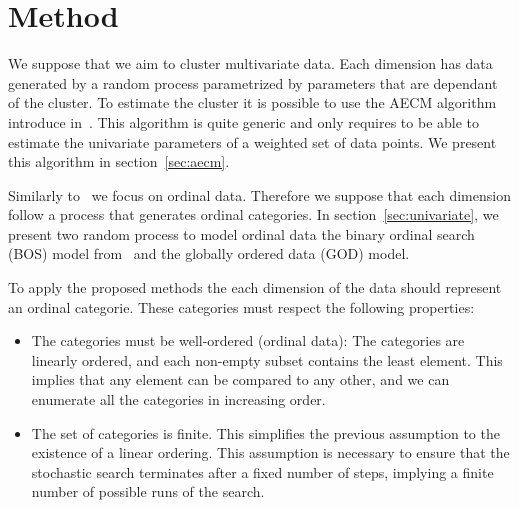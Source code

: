 \section{Method}

We suppose that we aim to cluster multivariate data. Each dimension has data generated by a random process parametrized by parameters that are dependant of the cluster. To estimate the cluster it is possible to use the AECM algorithm introduce in~\citep{meng1997algorithm}. This algorithm is quite generic and only requires to be able to estimate the univariate parameters of a weighted set of data points. We present this algorithm in section~\ref{sec:aecm}.

Similarly to~\cite{biernacki2016model} we focus on ordinal data. Therefore we suppose that each dimension follow a process that generates ordinal categories. 
In section~\ref{sec:univariate}, we present two random process to model ordinal data the binary ordinal search (BOS) model from~\cite{biernacki2016model} and the globally ordered data (GOD) model.

To apply the proposed methods the each dimension of the data should represent an ordinal categorie. These categories must respect the following properties:

\begin{itemize}
\item The categories must be well-ordered (ordinal data): The categories are linearly ordered, and each non-empty subset contains the least element. This implies that any element can be compared to any other, and we can enumerate all the categories in increasing order.

\item The set of categories is finite. This simplifies the previous assumption to the existence of a linear ordering. This assumption is necessary to ensure that the stochastic search terminates after a fixed number of steps, implying a finite number of possible runs of the search.
\end{itemize}



